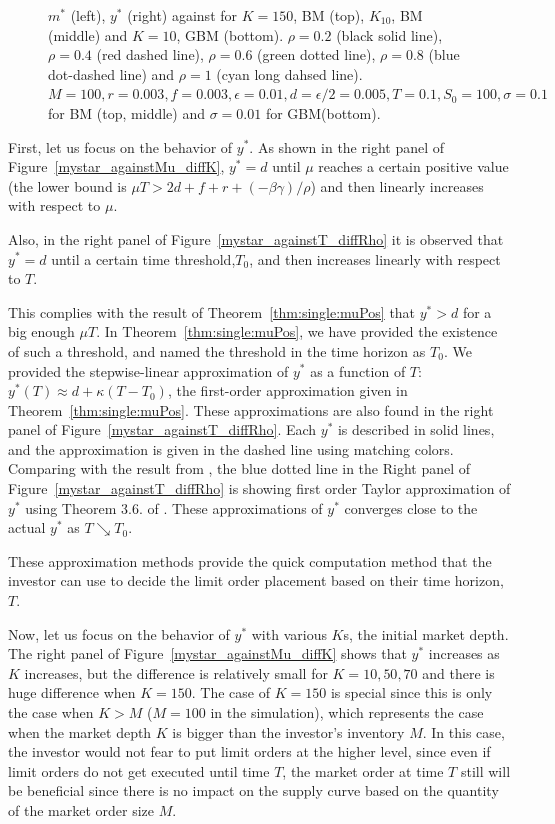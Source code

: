 \documentclass[11pt]{article}
\theoremstyle{plain}
\numberwithin{equation}{section}
\begin{document}
{{\begin{figure}
	\caption{ $m^*$ (left), $y^*$ (right) against for $K=150$, BM (top), $K_10$, BM (middle) and $K=10$, GBM (bottom). $\rho=0.2$ (black solid line), $\rho=0.4$ (red dashed line), $\rho=0.6$ (green dotted line), $\rho=0.8$ (blue dot-dashed line) and $\rho=1$ (cyan long dahsed line). $M=100, r=0.003, f=0.003, \epsilon=0.01, d=\epsilon/2=0.005, T=0.1, S_0=100, \sigma=0.1$ for BM (top, middle) and $\sigma=0.01$ for GBM(bottom).}
	\label{mystar_againstMu_diffRhos}
\end{figure}





\par First, let us focus on the behavior of $y^*$. As shown in the right panel of Figure~\ref{mystar_againstMu_diffK}, $y^*=d$ until $\mu$ reaches a certain positive value (the lower bound is $\mu T>2d+f+r+(-\beta \gamma)/\rho$)  and then linearly increases with respect to $\mu$. 

\par Also, in the right panel of Figure~\ref{mystar_againstT_diffRho} it is observed that $y^*=d$ until a certain time threshold,$T_0$, and then increases linearly with respect to $T$. 

\par This complies with the result of Theorem~\ref{thm:single:muPos} that $y^*>d$ for a big enough $\mu T$. In Theorem~\ref{thm:single:muPos}, we have provided the existence of such a threshold, and named the threshold in the time horizon as $T_0$. We provided the stepwise-linear approximation of $y^*$ as a function of $T$: $y^*(T)\approx d+\kappa (T-T_0)$, the first-order approximation given in Theorem~\ref{thm:single:muPos}. These approximations are also found in the right panel of Figure~\ref{mystar_againstT_diffRho}. Each $y^*$ is described in solid lines, and the approximation is given in the dashed line using matching colors. Comparing with the result from \cite{FLP:2018}, the blue dotted line in the Right panel of Figure~\ref{mystar_againstT_diffRho} is showing first order Taylor approximation of $y^*$ using Theorem 3.6. of \cite{FLP:2018}. These approximations of $y^*$ converges close to the actual $y^*$ as $T\searrow T_0$.  } These approximation methods provide the quick computation method that the investor can use to decide the limit order placement based on their time horizon, $T$.

\par Now, let us focus on the behavior of $y^*$ with various $K$s, the initial market depth. The right panel of Figure~\ref{mystar_againstMu_diffK} shows that $y^*$ increases as $K$ increases, but the difference is relatively small for $K=10, 50, 70$ and there is huge difference when $K=150$. The case of $K=150$ is special since this is only the case when $K>M$ ($M=100$ in the simulation), which represents the case when the market depth $K$ is bigger than the investor's inventory $M$. In this case, the investor would not fear to put limit orders at the higher level, since even if limit orders do not get  executed until time $T$, the market order at time $T$ still will be beneficial since there is no impact on the supply curve based on the quantity of the market order size $M$.
 
}
\end{document}
